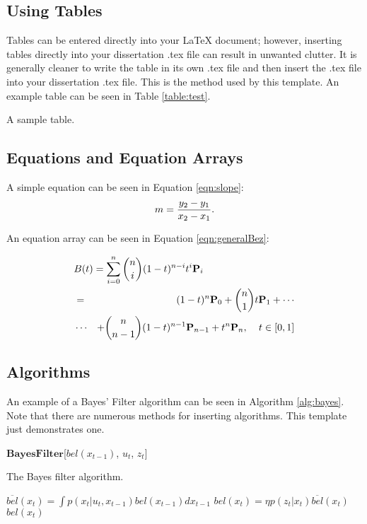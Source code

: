 \subsection{Using Tables}
Tables can be entered directly into your LaTeX document; however, inserting tables directly into your dissertation .tex file can result in unwanted clutter. It is generally cleaner to write the table in its own .tex file and then insert the .tex file into your dissertation .tex file. This is the method used by this template. An example table can be seen in Table \ref{table:test}.

\begin{table}
\scriptsize
\renewcommand{\tabcolsep}{0.09cm}
\centering

\caption{A sample table.}
\label{table:test}
\end{table}

\subsection{Equations and Equation Arrays}
A simple equation can be seen in Equation \ref{eqn:slope}:
\begin{equation}
\centering
m = \frac{y_{2} - y_{1}}{x_{2} - x_{1}}.
\label{eqn:slope}
\end{equation}

An equation array can be seen in Equation \ref{eqn:generalBez}: 

\begin{eqnarray}
\lefteqn{B(t) =  \sum_{i=0}^n \binom{n}{i} (1-t)^{n-i}t^{i}\mathbf{P}_i }\nonumber \\ 
& = & (1-t)^{n}\mathbf{P}_0 + \binom{n}{1}t\mathbf{P}_1+ \cdots  \nonumber \\
 &\cdots & + \binom{n}{n-1}(1-t)^{n-1}\mathbf{P}_{n-1} + t^{n}\mathbf{P}_n, \phantom{ttt} t \in [0,1]
\label{eqn:generalBez}
\end{eqnarray}

\subsection{Algorithms}
An example of a Bayes' Filter \citep*{Thrun2005} algorithm can be seen in Algorithm \ref{alg:bayes}. Note that there are numerous methods for inserting algorithms. This template just demonstrates one.

\begin{algorithm}{$\mathbf{Bayes Filter}$}[$bel(x_{t-1})$, $u_t$, $z_t$]
\caption{The Bayes filter algorithm.}
\label{alg:bayes}
\begin{algorithmic}[1]
\STATE $\overline{bel}(x_t) = \int p(x_t | u_t, x_{t-1}) bel(x_{t-1})dx_{t-1}$
\STATE $bel(x_t) = \eta p(z_t | x_t) \overline{bel}(x_t)$
\ENDFOR
\RETURN $bel(x_t)$
\end{algorithmic}
\end{algorithm}
